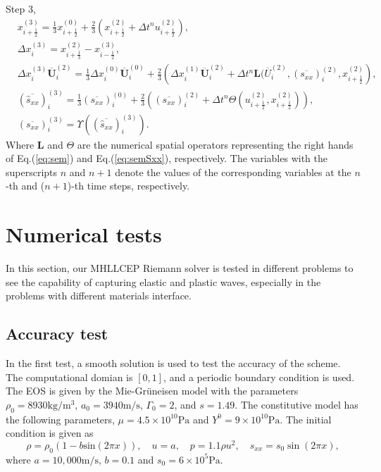 \documentclass{article}
\numberwithin{equation}{section}
\numberwithin{table}{section}
\begin{document}
Step 3,
\begin{equation}
  \begin{aligned}
	& x_{i+\frac{1}{2}}^{(3)} = \frac{1}{3} x_{i+\frac{1}{2}}^{(0)}+\frac{2}{3} \left( x_{i+\frac{1}{2}}^{(2)}+\Delta t^n u_{i+\frac{1}{2}}^{(2)}\right),\\
	& \Delta x_i^{(3)} =  x_{i+\frac{1}{3}}^{(2)}- x_{i-\frac{1}{2}}^{(3)},\\
	& \Delta x_i^{(3)} \overline{\bm{U}}_i^{(2)}  = \frac{1}{3} \Delta x_i^{(0)} \overline{\bm{U}}_i^{(0)}+ \frac{2}{3} \left(  \Delta x_i^{(1)} \overline{\bm{U}}_i^{(2)} + \Delta t^n \bm{L}(\overline{U}_i^{(2)}, (\overline{s_{xx}})_i^{(2)}, x_{i+\frac{1}{2}}^{(2)} \right),\\
	& (\overline{\hat{s}_{xx}})_i^{(3)} =\frac{1}{3} (\overline{s_{xx}})_i^{(0)} + \frac{2}{3} \left(  (\overline{s_{xx}})_i^{(2)}+\Delta t^ n \varTheta (u_{i+\frac{1}{2}}^{(2)}, x_{i+\frac{1}{2}}^{(2)})\right),\\
  & (\overline{s_{xx}})_i^{(3)} = \Upsilon((\overline{\hat{s}_{xx}})_i^{(3)}).
\end{aligned}
\end{equation}
Where $\bm{L}$ and $\varTheta$ are the numerical spatial operators representing the right hands of Eq.(\ref{eq:sem}) and Eq.(\ref{eq:semSxx}), respectively. The variables with the superscripts $n$ and $n+1$ denote the values of the corresponding variables at the $n$-th and ($n+1$)-th time steps, respectively.

\section{Numerical tests}
In this section, our MHLLCEP Riemann solver is tested  in different problems to see the capability of  capturing elastic and plastic waves, especially in the problems  with different materials interface.

\subsection{Accuracy test}
In the first test, a smooth solution is used to test the accuracy of the scheme. The computational domian is $[0,1]$, and a periodic boundary condition is used. The EOS is given by the Mie-Gr\"uneisen model with the parameters $\rho_0 = 8930 \text{kg}/\text{m}^3$, $a_0 = 3940 \text{m}/\text{s}$, $\Gamma_0 =2$, and $s=1.49$. The constitutive model has the following parameters, $\mu = 4.5\times 10^{10} \text{Pa}$ and $Y^0 = 9\times 10^{10} \text{Pa}$.  The initial condition  is  given as
\begin{equation}
  \rho = \rho_0(1-b \text{sin}(2\pi x)), \quad u = a, \quad p = 1.1\rho u^2, \quad  s_{xx} = s_0 \sin(2\pi x),
\end{equation}
where $a = 10,000\text{m}/\text{s}$, $ b = 0.1$  and  $s_0 = 6\times 10^5 \text{Pa}$.
\end{document}
